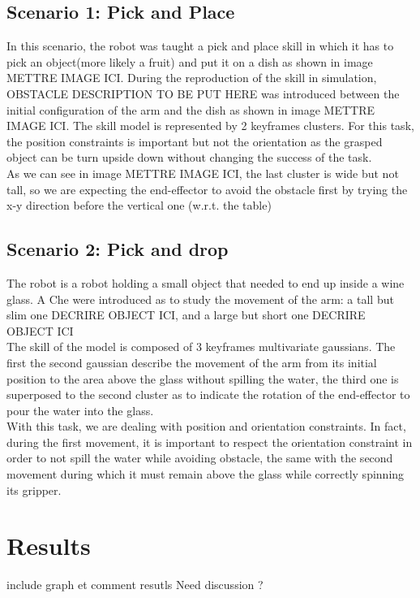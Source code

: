 \documentclass[letterpaper, 10 pt, conference]{ieeeconf}  %
\begin{document}
\subsection{Scenario 1: Pick and Place}
In this scenario, the robot was taught a pick and place skill in which it has to pick an object(more likely a fruit) and put it on a dish as shown in image METTRE IMAGE ICI. During the reproduction of the skill in simulation, OBSTACLE DESCRIPTION TO BE PUT HERE  was introduced between the initial configuration of the arm and the dish as shown in image METTRE IMAGE ICI.
 The skill model is represented by 2 keyframes clusters. For this task, the position constraints is important but not the orientation as the grasped object can be turn upside down without changing the success of the task.\\
 As we can see in image METTRE IMAGE ICI, the last cluster is wide but not tall, so we are expecting the end-effector to avoid the obstacle first by trying the x-y direction before the vertical one (w.r.t. the table)

\subsection{Scenario 2: Pick and drop}
 The robot is a robot holding a small object that needed to end up inside a  wine glass.
A Che were introduced as to study the movement of the arm: a tall but slim one DECRIRE OBJECT ICI, and a large but short one DECRIRE OBJECT ICI\\
The skill of the model is composed of 3 keyframes multivariate gaussians. The first the second gaussian describe the movement of the arm from its initial position to the area above the glass without spilling the water, the third one is superposed to the second cluster as to indicate the rotation of the end-effector to pour the water into the glass.\\
With this task, we are dealing with position and orientation constraints. In fact, during the first movement, it is important to respect the orientation constraint in order to not spill the water while avoiding obstacle, the same with the second movement during which it must remain above the glass while correctly spinning its gripper.\\

\section{Results}
include graph et comment resutls 
Need discussion ? 
\end{document}
